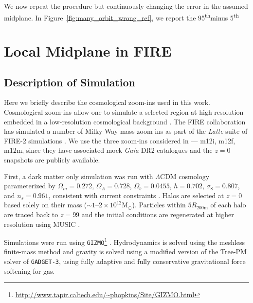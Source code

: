 \documentclass[twocolumn]{aastex62}
\newcommand{\Msun}{\text{M}_\odot}
\newcommand{\z}{z}
\newcommand{\uth}{\textsuperscript{th}} %
\begin{document}
\begin{figure*}
\caption{Caption.}
\label{fig:one_orbit_wrong_ref}
\end{figure*}

We now repeat the procedure but continuously changing the error in the assumed
midplane. In Figure~\ref{fig:many_orbit_wrong_ref}, we report the 95\uth minus
5\uth



\begin{figure*}
\caption{Caption.}
\label{fig:many_orbit_wrong_ref}
\end{figure*}

\section{Local Midplane in FIRE} \label{sec:local_fire}
\subsection{Description of Simulation} \label{ssec:cosmozoom}
Here we briefly describe the cosmological zoom-ins used in this work.
Cosmological zoom-ins allow one to simulate a selected region at high
resolution embedded in a low-resolution cosmological background
\citep[e.g.][]{1993ApJ...412..455K,2014MNRAS.437.1894O}. The FIRE
collaboration has simulated a number of Milky Way-mass zoom-ins as part of the
{\em Latte} suite of FIRE-2 simulations
\citep{2016ApJ...827L..23W,2018MNRAS.481.4133G}. We use the three zoom-ins
considered in \citet{2018arXiv180610564S} --- m12i, m12f, m12m, since they
have associated mock {\em Gaia} DR2 catalogues and the $z=0$ snapshots are
publicly available.

First, a dark matter only simulation was run with $\Lambda$CDM cosmology
parameterized by $\Omega_m = 0.272$, $\Omega_{\Lambda} = 0.728$, $\Omega_b =
0.0455$, $h = 0.702$, $\sigma_8 = 0.807$, and $n_s = 0.961$, consistent with
current constraints \citep{2018arXiv180706209P}. Halos are selected at $z=0$
based solely on their mass ($\sim 1\text{--}2 \times 10^{12} \Msun$).
Particles within $5 R_{200\text{m}}$ of each halo are traced back to $\z=99$
and the initial conditions are regenerated at higher resolution using MUSIC
\citep{2011MNRAS.415.2101H}.

Simulations were run using
\texttt{GIZMO}\footnote{\url{http://www.tapir.caltech.edu/~phopkins/Site/GIZMO.html}}
\citep{2015MNRAS.450...53H}. Hydrodynamics is solved using the meshless
finite-mass method and gravity is solved using a modified version of the
Tree-PM solver of \texttt{GADGET-3}, using fully adaptive and fully
conservative gravitational force softening for gas.
\end{document}
